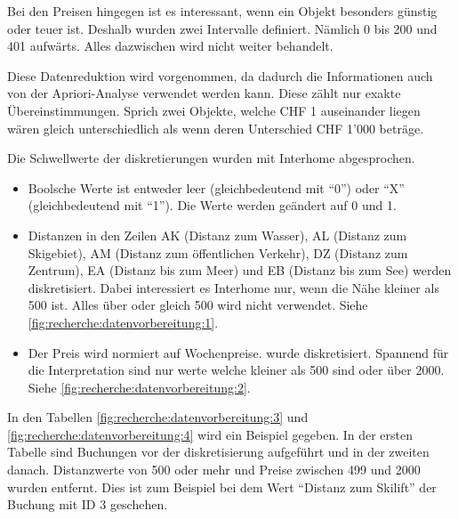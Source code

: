 Bei den Preisen hingegen ist es interessant, wenn ein Objekt besonders günstig oder teuer ist. Deshalb wurden zwei Intervalle definiert. Nämlich 0 bis 200 und 401 aufwärts. Alles dazwischen wird nicht weiter behandelt.

Diese Datenreduktion wird vorgenommen, da dadurch die Informationen auch von der Apriori-Analyse verwendet werden kann. Diese zählt nur exakte Übereinstimmungen. Sprich zwei Objekte, welche CHF 1 auseinander liegen wären gleich unterschiedlich als wenn deren Unterschied CHF 1'000 beträge.

Die Schwellwerte der diskretierungen wurden mit Interhome abgesprochen.

\begin{itemize}
\item Boolsche Werte ist entweder leer (gleichbedeutend mit "`0"') oder "`X"' (gleichbedeutend mit "`1"'). Die Werte werden geändert auf 0 und 1.
\item Distanzen in den Zeilen AK (Distanz zum Wasser), AL (Distanz zum Skigebiet), AM (Distanz zum öffentlichen Verkehr), DZ (Distanz zum Zentrum), EA (Distanz bis zum Meer) und EB (Distanz bis zum See) werden diskretisiert. Dabei interessiert es Interhome nur, wenn die Nähe kleiner als 500 ist. Alles über oder gleich 500 wird nicht verwendet. Siehe \cref{fig:recherche:datenvorbereitung:1}.
\item Der Preis wird normiert auf Wochenpreise. wurde diskretisiert. Spannend für die Interpretation sind nur werte welche kleiner als 500 sind oder über 2000. Siehe \cref{fig:recherche:datenvorbereitung:2}.
\end{itemize}





In den Tabellen \ref{fig:recherche:datenvorbereitung:3} und \ref{fig:recherche:datenvorbereitung:4} wird ein Beispiel gegeben. In der ersten Tabelle sind Buchungen vor der diskretisierung aufgeführt und in der zweiten danach. Distanzwerte von 500 oder mehr und Preise zwischen 499 und 2000 wurden entfernt. Dies ist zum Beispiel bei dem Wert "`Distanz zum Skilift"' der Buchung mit ID 3 geschehen.

